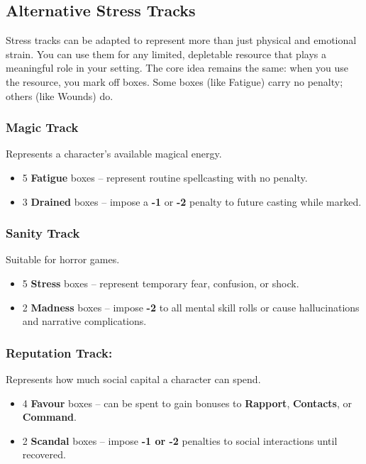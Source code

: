 \subsection{Alternative Stress Tracks}

Stress tracks can be adapted to represent more than just physical and emotional strain. You can use them for any limited, depletable resource that plays a meaningful role in your setting. The core idea remains the same: when you use the resource, you mark off boxes. Some boxes (like Fatigue) carry no penalty; others (like Wounds) do.

\subsubsection{Magic Track}
Represents a character’s available magical energy. 
    \begin{itemize}
        \item 5 \textbf{Fatigue} boxes – represent routine spellcasting with no penalty.
        \item 3 \textbf{Drained} boxes – impose a \textbf{-1} or \textbf{-2} penalty to future casting while marked.
    \end{itemize}

\subsubsection{Sanity Track}
Suitable for horror games. 
    \begin{itemize}
        \item 5 \textbf{Stress} boxes – represent temporary fear, confusion, or shock.
        \item 2 \textbf{Madness} boxes – impose \textbf{-2} to all mental skill rolls or cause hallucinations and narrative complications.
    \end{itemize}

\subsubsection{Reputation Track:} Represents how much social capital a character can spend. 
    \begin{itemize}
        \item 4 \textbf{Favour} boxes – can be spent to gain bonuses to \textbf{Rapport}, \textbf{Contacts}, or \textbf{Command}.
        \item 2 \textbf{Scandal} boxes – impose \textbf{-1 or -2} penalties to social interactions until recovered.
    \end{itemize}


